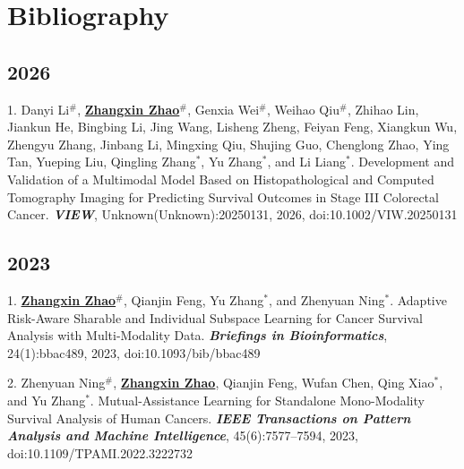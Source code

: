 \documentclass{article}
\begin{document}
\section*{Bibliography}

\subsection*{2026}

1. Danyi Li$^{\#}$, \underline{\textbf{Zhangxin Zhao}}$^{\#}$, Genxia Wei$^{\#}$, Weihao Qiu$^{\#}$, Zhihao Lin, Jiankun He, Bingbing Li, Jing Wang, Lisheng Zheng, Feiyan Feng, Xiangkun Wu, Zhengyu Zhang, Jinbang Li, Mingxing Qiu, Shujing Guo, Chenglong Zhao, Ying Tan, Yueping Liu, Qingling Zhang$^{*}$, Yu Zhang$^{*}$, and Li Liang$^{*}$. Development and Validation of a Multimodal Model Based on Histopathological and Computed Tomography Imaging for Predicting Survival Outcomes in Stage III Colorectal Cancer. \textbf{\textit{VIEW}}, Unknown(Unknown):20250131, 2026, doi:10.1002/VIW.20250131

\subsection*{2023}

1. \underline{\textbf{Zhangxin Zhao}}$^{\#}$, Qianjin Feng, Yu Zhang$^{*}$, and Zhenyuan Ning$^{*}$. Adaptive Risk-Aware Sharable and Individual Subspace Learning for Cancer Survival Analysis with Multi-Modality Data. \textbf{\textit{Briefings in Bioinformatics}}, 24(1):bbac489, 2023, doi:10.1093/bib/bbac489

2. Zhenyuan Ning$^{\#}$, \underline{\textbf{Zhangxin Zhao}}, Qianjin Feng, Wufan Chen, Qing Xiao$^{*}$, and Yu Zhang$^{*}$. Mutual-Assistance Learning for Standalone Mono-Modality Survival Analysis of Human Cancers. \textbf{\textit{IEEE Transactions on Pattern Analysis and Machine Intelligence}}, 45(6):7577–7594, 2023, doi:10.1109/TPAMI.2022.3222732
\end{document}
